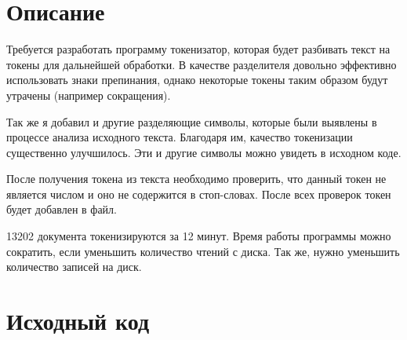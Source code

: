 \section{Описание}
Требуется разработать программу токенизатор, которая будет разбивать текст на токены для дальнейшей обработки. В качестве разделителя довольно эффективно использовать знаки препинания, однако некоторые токены таким образом будут утрачены (например сокращения). 

Так же я добавил и другие разделяющие символы, которые были выявлены в процессе анализа исходного текста. Благодаря им, качество токенизации существенно улучшилось. Эти и другие символы можно увидеть в исходном коде.

После получения токена из текста необходимо проверить, что данный токен не является числом и оно не содержится в стоп-словах. После всех проверок токен будет добавлен в файл.

13202 документа токенизируются за 12 минут. Время работы программы можно сократить, если уменьшить количество чтений с диска. Так же, нужно уменьшить количество записей на диск.

\pagebreak

\section{Исходный код}


